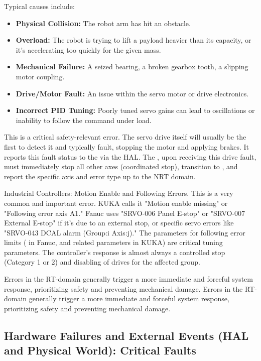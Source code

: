 Typical causes include:
\begin{itemize}
    \item \textbf{Physical Collision:} The robot arm has hit an obstacle.
    \item \textbf{Overload:} The robot is trying to lift a payload heavier than its capacity, or it's accelerating too quickly for the given mass.
    \item \textbf{Mechanical Failure:} A seized bearing, a broken gearbox tooth, a slipping motor coupling.
    \item \textbf{Drive/Motor Fault:} An issue within the servo motor or drive electronics.
    \item \textbf{Incorrect PID Tuning:} Poorly tuned servo gains can lead to oscillations or inability to follow the command under load.
\end{itemize}

This is a critical safety-relevant error. The servo drive itself will usually be the first to detect it and typically fault, stopping the motor and applying brakes. It reports this fault status to the  via the HAL. The , upon receiving this drive fault, must immediately stop all other axes (coordinated stop), transition to , and report the specific axis and error type up to the NRT domain.

\begin{principlebox}{Industrial Controllers: Motion Enable and Following Errors.}
    This is a very common and important error. KUKA calls it "Motion enable missing" or "Following error axis A1." Fanuc uses "SRVO-006 Panel E-stop" or "SRVO-007 External E-stop" if it's due to an external stop, or specific servo errors like "SRVO-043 DCAL alarm (Group:i Axis:j)." The parameters for following error limits ( in Fanuc,  and related parameters in KUKA) are critical tuning parameters. The controller's response is almost always a controlled stop (Category 1 or 2) and disabling of drives for the affected group.
\end{principlebox}

Errors in the RT-domain generally trigger a more immediate and forceful system response, prioritizing safety and preventing mechanical damage.
Errors in the RT-domain generally trigger a more immediate and forceful system response, prioritizing safety and preventing mechanical damage.

\subsection{Hardware Failures and External Events (HAL and Physical World): Critical Faults}
\label{subsec:hal-physical-errors} %

